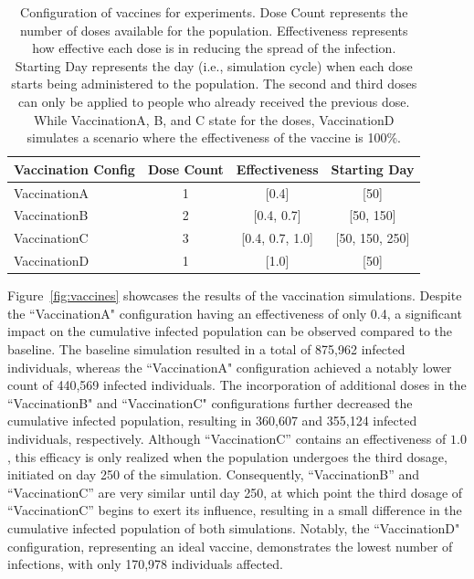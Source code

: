 \begin{table}[ht]
\centering
\caption{Configuration of vaccines for experiments. Dose Count represents the number of doses available for the population. Effectiveness represents how effective each dose is in reducing the spread of the infection. Starting Day represents the day (i.e., simulation cycle) when each dose starts being administered to the population. The second and third doses can only be applied to people who already received the previous dose. While VaccinationA, B, and C state for the doses, VaccinationD simulates a scenario where the effectiveness of the vaccine is 100\%.}
\label{tbl:vaccine_configuration}
\begin{tabular}{@{}lccc@{}}
\toprule
Vaccination Config & \multicolumn{1}{l}{Dose Count} & Effectiveness  & Starting Day  \\ \midrule
VaccinationA       & 1                              & {[}0.4{]}           & {[}50{]}           \\
VaccinationB       & 2                              & {[}0.4, 0.7{]}      & {[}50, 150{]}      \\
VaccinationC       & 3                              & {[}0.4, 0.7, 1.0{]} & {[}50, 150, 250{]} \\
VaccinationD       & 1                              & {[}1.0{]}           & {[}50{]}           \\ \bottomrule
\end{tabular}
\end{table}

Figure~\ref{fig:vaccines} showcases the results of the vaccination simulations. Despite the ``VaccinationA" configuration having an effectiveness of only 0.4, a significant impact on the cumulative infected population can be observed compared to the baseline. The baseline simulation resulted in a total of 875,962 infected individuals, whereas the ``VaccinationA" configuration achieved a notably lower count of 440,569 infected individuals. The incorporation of additional doses in the ``VaccinationB" and ``VaccinationC" configurations further decreased the cumulative infected population, resulting in 360,607 and 355,124 infected individuals, respectively. 
Although ``VaccinationC'' contains an effectiveness of $1.0$, this efficacy is only realized when the population undergoes the third dosage, initiated on day 250 of the simulation. Consequently, ``VaccinationB'' and ``VaccinationC'' are very similar until day 250, at which point the third dosage of ``VaccinationC'' begins to exert its influence, resulting in a small difference in the cumulative infected population of both simulations.
Notably, the ``VaccinationD" configuration, representing an ideal vaccine, demonstrates the lowest number of infections, with only 170,978 individuals affected.

